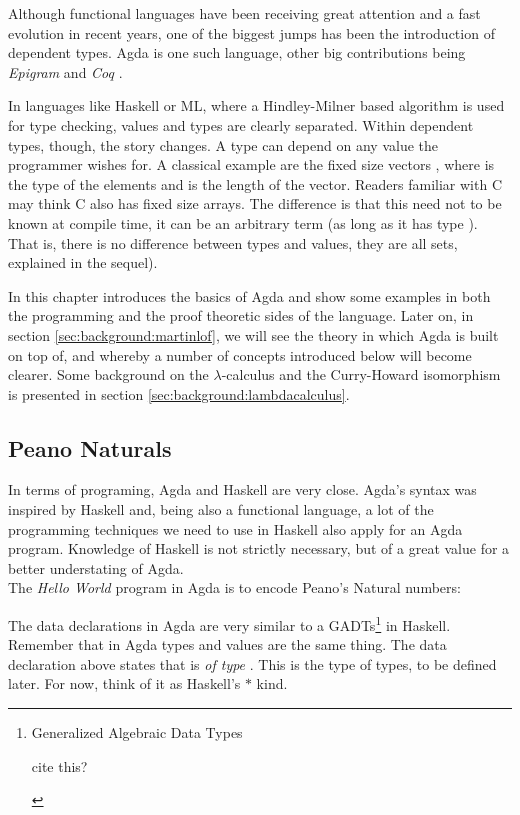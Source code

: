 Although functional languages have been receiving great attention
and a fast evolution in recent years, one of the biggest jumps
has been the introduction of dependent types. Agda\cite{norell07} is one such language, other 
big contributions being \emph{Epigram} \cite{mcbride05} and \emph{Coq} \cite{bertot06}. 

In languages like Haskell or ML, where a Hindley-Milner based algorithm is used
for type checking, values and types are clearly separated. Within dependent
types, though, the story changes. A type can depend on any value the programmer
wishes for. A classical example are the fixed size vectors , where 
is the type of the elements and  is the length of the vector. Readers familiar
with C may think C also has fixed size arrays. The difference is that
this  need not to be known at compile time, it can be an arbitrary term (as long
as it has type ). That is, there is no difference between types and values,
they are all sets, explained in the sequel).

In this chapter introduces the basics of Agda and show some examples in both
the programming and the proof theoretic sides of the language. Later on, in 
section \ref{sec:background:martinlof}, we will see the theory in which Agda is built 
on top of, and whereby a number of concepts introduced below will become clearer. 
Some background on the $\lambda$-calculus and the Curry-Howard isomorphism is
presented in section \ref{sec:background:lambdacalculus}.

\subsection{Peano Naturals}

In terms of programing, Agda and Haskell are very close. Agda's syntax was
inspired by Haskell and, being also a functional language, a lot of
the programming techniques we need to use in Haskell also apply for an Agda program.
Knowledge of Haskell is not strictly necessary, but of a great value for a better
understating of Agda.\\

The \emph{Hello World} program in Agda is to encode Peano's Natural numbers:


The data declarations in Agda are very similar to a GADTs\footnote{
Generalized Algebraic Data Types
\begin{TODO}
  \item cite this?
\end{TODO}
} in Haskell. Remember that in Agda types and values are the same thing.
The data declaration above states that  is \emph{of type} 
. This  is the type of types, to be defined later. 
For now, think of it as Haskell's $*$ kind.


